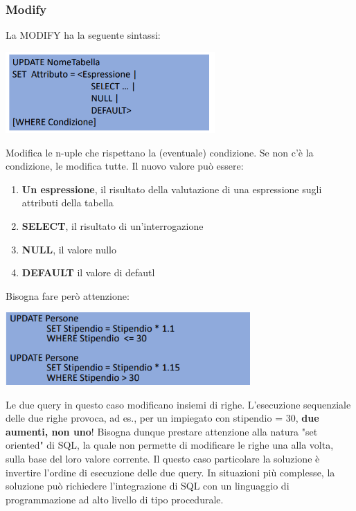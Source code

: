 \documentclass[12pt]{article}
\begin{document}
\subsubsection{Modify}
La MODIFY ha la seguente sintassi:
\begin{center}
    \includegraphics[width = 0.60\textwidth]{Images/206.PNG}
\end{center}
Modifica le n-uple che rispettano la (eventuale) condizione.
Se non c'è la condizione, le modifica tutte.
Il nuovo valore può essere:
\begin{enumerate}
    \item \textbf{Un espressione}, il risultato della valutazione di una espressione sugli attributi della tabella
    \item \textbf{SELECT}, il risultato di un'interrogazione
    \item \textbf{NULL}, il valore nullo
    \item \textbf{DEFAULT} il valore di defautl
\end{enumerate}
Bisogna fare però attenzione:
\begin{center}
    \includegraphics[width = 0.70\textwidth]{Images/207.PNG}
\end{center}
Le due query in questo caso modificano insiemi di righe.
L'esecuzione sequenziale delle due righe provoca, ad es., per un impiegato con stipendio = 30, \textbf{due aumenti, non uno}!
Bisogna dunque prestare attenzione alla natura "set oriented" di SQL, la quale non permette di modificare le righe una alla volta, sulla base del loro valore corrente.
Il questo caso particolare la soluzione è invertire l'ordine di esecuzione delle due query. In situazioni più complesse, la soluzione può richiedere l'integrazione di SQL con un linguaggio di programmazione ad alto livello di tipo procedurale.
\end{document}
